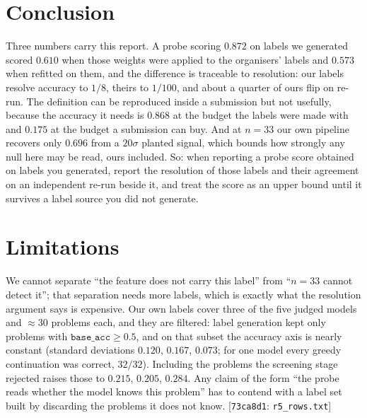 \documentclass[10pt]{article}
\newcommand{\cmt}[2]{{\footnotesize\textsf{[}\texttt{#1}\textsf{:} #2\textsf{]}}}
\begin{document}
\section{Conclusion}
\label{sec:conclusion}
Three numbers carry this report. A probe scoring $0.872$ on labels we generated scored $0.610$ when
those weights were applied to the organisers' labels and $0.573$ when refitted on them, and the
difference is traceable to resolution: our labels resolve accuracy to $1/8$, theirs to $1/100$, and
about a quarter of ours flip on re-run. The definition can be reproduced inside a submission but not
usefully, because the accuracy it needs is $0.868$ at the budget the labels were made with and
$0.175$ at the budget a submission can buy. And at $n{=}33$ our own pipeline recovers only $0.696$
from a $20\sigma$ planted signal, which bounds how strongly any null here may be read, ours included.
So: when reporting a probe score obtained on labels you generated, report the resolution of those
labels and their agreement on an independent re-run beside it, and treat the score as an upper bound
until it survives a label source you did not generate.

\section*{Limitations}
\label{sec:limits}
We cannot separate ``the feature does not carry this label'' from ``$n{=}33$ cannot detect it'';
that separation needs more labels, which is exactly what the resolution argument says is expensive.
Our own labels cover three of the five judged models and $\approx 30$ problems each, and they are
filtered: label generation kept only problems with $\texttt{base\_acc} \ge 0.5$, and on that subset
the accuracy axis is nearly constant (standard deviations $0.120$, $0.167$, $0.073$; for one model
every greedy continuation was correct, $32/32$). Including the problems the screening stage rejected
raises those to $0.215$, $0.205$, $0.284$. Any claim of the form ``the probe reads whether the model
knows this problem'' has to contend with a label set built by discarding the problems it does not
know. \cmt{73ca8d1}{\texttt{r5\_rows.txt}}
\end{document}
